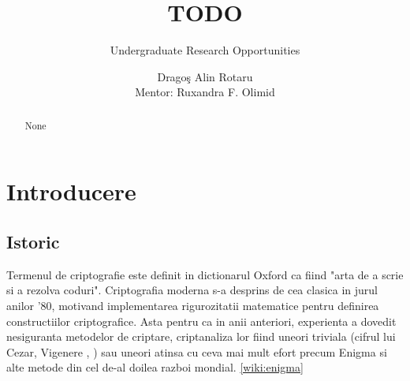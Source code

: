 \documentclass{llncs}
\begin{document}
\pagestyle{empty}
%
%
\title{TODO}
%
%
\subtitle{Undergraduate Research Opportunities}
\author{Drago\c{s} Alin Rotaru\\{\small Mentor: Ruxandra F. Olimid}}
%



\maketitle              %

\begin{abstract}
  None
\end{abstract}


\section{Introducere}
\label{sec:intro}

\subsection{Istoric}
Termenul de criptografie este definit in dictionarul Oxford ca fiind "arta de a scrie si a rezolva coduri".
Criptografia moderna s-a desprins de cea clasica in jurul anilor '80, motivand implementarea rigurozitatii matematice pentru definirea constructiilor criptografice. Asta pentru ca in anii anteriori, experienta a dovedit nesiguranta metodelor de criptare, criptanaliza lor fiind uneori triviala (cifrul lui Cezar, Vigenere \cite{Caesar:2015}, \cite{Vigenere:2015}) sau uneori atinsa cu ceva mai mult efort precum Enigma si alte metode din cel de-al doilea razboi mondial. \ref{wiki:enigma}
\end{document}
